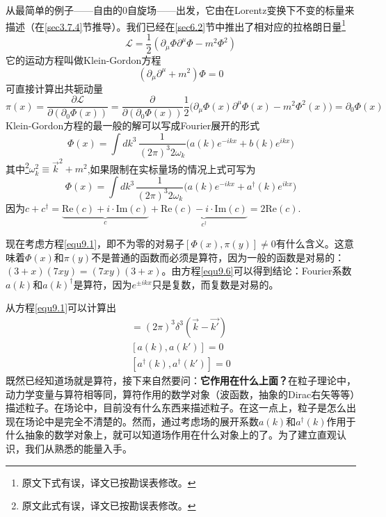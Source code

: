 从最简单的例子——自由的$0$自旋场——出发，它由在Lorentz变换下不变的标量来描述（在\ref{sec3.7.4}节推导）。我们已经在\ref{sec6.2}节中推出了相对应的拉格朗日量\footnote{原文下式有误，译文已按勘误表修改。}
\begin{equation} \label{equ9.3}
    \mathscr{L}=\frac{1}{2}(\partial_{\mu}\Phi \partial^{\mu}\Phi-m^{2}\Phi^{2})
\end{equation}
它的运动方程叫做Klein-Gordon方程
\begin{equation} \label{equ9.4}
    (\partial_{\mu}\partial^{\mu}+m^{2})\Phi=0
\end{equation}
可直接计算出共轭动量
\[
    \pi(x)=\frac{\partial \mathscr{L}}{\partial( \partial_{0}\Phi(x))}=\frac{\partial}{\partial(\partial_{0}\Phi(x))} \frac{1}{2} \Big(\partial_{\mu}\Phi(x)\partial^{\mu}\Phi(x)-m^{2}\Phi^{2}(x) \Big) = \partial_{0}\Phi(x)
\]
Klein-Gordon方程的最一般的解可以写成Fourier展开的形式
\begin{equation} \label{equ9.5}
	\Phi(x)=\int dk^{3}\, \frac{1}{(2\pi)^{3}2\omega_{k}} \big( a(k) e^{-ikx} + b(k) e^{ikx} \big)
\end{equation}
其中\footnote{原文此式有误，译文已按勘误表修改。}$\omega_k^{2} \equiv \vec{k}^{2} + m^{2}$,如果限制在实标量场的情况上式可写为
\begin{equation} \label{equ9.6}
	\Phi(x)=\int dk^{3}\, \frac{1}{(2\pi)^{3}2\omega_{k}} \big( a(k)e^{-ikx}+a^{\dag}(k)e^{ikx} \big)
\end{equation}
因为$c+c^{\dag}=\underbrace{\text{Re}(c)+i \cdot \text{Im}(c)}_{c}+\underbrace{\text{Re}(c)-i \cdot \text{Im}(c)}_{c^{\dag}}=2\text{Re}(c)$.

现在考虑方程\eqref{equ9.1}，即不为零的对易子$[\Phi(x),\pi(y)]\neq 0$有什么含义。这意味着$\Phi(x)$和$\pi(y)$不是普通的函数而必须是算符，因为一般的函数是对易的：$(3+x)(7xy)=(7xy)(3+x)$。由方程\eqref{equ9.6}可以得到结论：Fourier系数$a(k)$和$a(k)^{\dag}$是算符，因为$e^{\pm ikx}$只是复数，而复数是对易的。

从方程\eqref{equ9.1}可以计算出
\begin{align}
	[a(k),a^{\dag}(k')]=(2\pi)^{3}\delta^{3}(\vec{k}-\vec{k'}) \label{equ9.7} \\
	[a(k),a(k')]=0 \label{equ9.8} \\
	[a^{\dag}(k),a^{\dag}(k')]=0 \label{equ9.9}
\end{align}
既然已经知道场就是算符，接下来自然要问：{\bf 它作用在什么上面？}在粒子理论中，动力学变量与算符相等同，算符作用的数学对象（波函数，抽象的Dirac右矢等等）描述粒子。在场论中，目前没有什么东西来描述粒子。在这一点上，粒子是怎么出现在场论中是完全不清楚的。然而，通过考虑场的展开系数$a(k)$和$a^{\dag}(k)$作用于什么抽象的数学对象上，就可以知道场作用在什么对象上的了。为了建立直观认识，我们从熟悉的能量入手。

